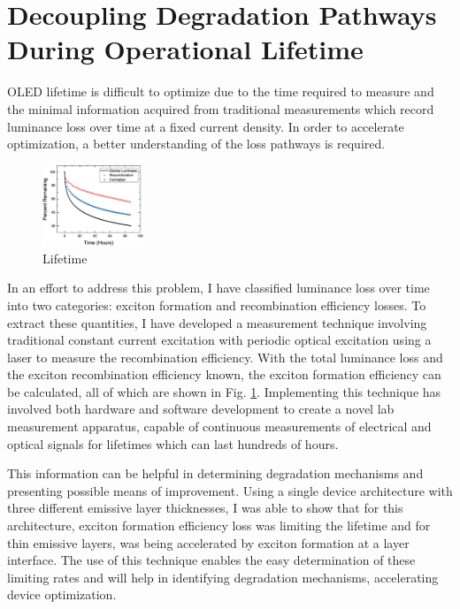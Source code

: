 \documentclass[a4paper,titlepage]{article}
\begin{document}
\section*{Decoupling Degradation Pathways During Operational Lifetime}

OLED lifetime is difficult to optimize due to the time required to measure and the minimal information acquired from traditional measurements which record luminance loss over time at a fixed current density.
In order to accelerate optimization, a better understanding of the loss pathways is required.
  

\begin{figure}
\vspace{-12pt}
\includegraphics[width=0.27\textwidth]{lifetime.eps}
\caption{Lifetime}
\label{lifetime}
\vspace{-20pt}
\end{figure}

In an effort to address this problem, I have classified luminance loss over time into two categories:  exciton formation and recombination efficiency losses.
To extract these quantities, I have developed a measurement technique involving traditional constant current excitation with periodic optical excitation using a laser to measure the recombination efficiency.
With the total luminance loss and the exciton recombination efficiency known, the exciton formation efficiency can be calculated, all of which are shown in Fig. \ref{lifetime}.
Implementing this technique has involved both hardware and software development to create a novel lab measurement apparatus, capable of continuous measurements of electrical and optical signals for lifetimes which can last hundreds of hours.


This information can be helpful in determining degradation mechanisms and presenting possible means of improvement.
Using a single device architecture with three different emissive layer thicknesses, I was able to show that for this architecture, exciton formation efficiency loss was limiting the lifetime and for thin emissive layers, was being accelerated by exciton formation at a layer interface.
The use of this technique enables the easy determination of these limiting rates and will help in identifying degradation mechanisms, accelerating device optimization.
\end{document}
